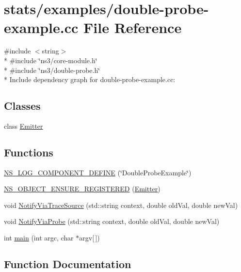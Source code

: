 \hypertarget{double-probe-example_8cc}{}\section{stats/examples/double-\/probe-\/example.cc File Reference}
\label{double-probe-example_8cc}
{\ttfamily \#include $<$string$>$}\\*
{\ttfamily \#include \char`\"{}ns3/core-\/module.\+h\char`\"{}}\\*
{\ttfamily \#include \char`\"{}ns3/double-\/probe.\+h\char`\"{}}\\*
Include dependency graph for double-\/probe-\/example.cc\+:
\subsection*{Classes}
\begin{DoxyCompactItemize}
\item 
class \hyperlink{classEmitter}{Emitter}
\end{DoxyCompactItemize}
\subsection*{Functions}
\begin{DoxyCompactItemize}
\item 
\hyperlink{double-probe-example_8cc_a4221fc0a2b6bdcba051c86d8e8f9b248}{N\+S\+\_\+\+L\+O\+G\+\_\+\+C\+O\+M\+P\+O\+N\+E\+N\+T\+\_\+\+D\+E\+F\+I\+NE} (\char`\"{}Double\+Probe\+Example\char`\"{})
\item 
\hyperlink{double-probe-example_8cc_a02543ef64adac04c3ef2c7c137ee4d9f}{N\+S\+\_\+\+O\+B\+J\+E\+C\+T\+\_\+\+E\+N\+S\+U\+R\+E\+\_\+\+R\+E\+G\+I\+S\+T\+E\+R\+ED} (\hyperlink{classEmitter}{Emitter})
\item 
void \hyperlink{double-probe-example_8cc_aa6eb1c76f6ae41b129d9e94734c64824}{Notify\+Via\+Trace\+Source} (std\+::string context, double old\+Val, double new\+Val)
\item 
void \hyperlink{double-probe-example_8cc_a2b89eb6cf8dc830f27ce00766bf62c68}{Notify\+Via\+Probe} (std\+::string context, double old\+Val, double new\+Val)
\item 
int \hyperlink{double-probe-example_8cc_a0ddf1224851353fc92bfbff6f499fa97}{main} (int argc, char $\ast$argv\mbox{[}$\,$\mbox{]})
\end{DoxyCompactItemize}


\subsection{Function Documentation}
